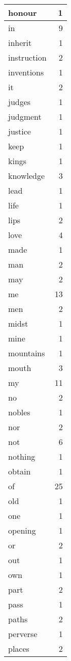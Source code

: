 \begin{center}
\begin{longtable}{l|r}
honour & 1\\ \hline 
in & 9\\ \hline 
inherit & 1\\ \hline 
instruction & 2\\ \hline 
inventions & 1\\ \hline 
it & 2\\ \hline 
judges & 1\\ \hline 
judgment & 1\\ \hline 
justice & 1\\ \hline 
keep & 1\\ \hline 
kings & 1\\ \hline 
knowledge & 3\\ \hline 
lead & 1\\ \hline 
life & 1\\ \hline 
lips & 2\\ \hline 
love & 4\\ \hline 
made & 1\\ \hline 
man & 2\\ \hline 
may & 2\\ \hline 
me & 13\\ \hline 
men & 2\\ \hline 
midst & 1\\ \hline 
mine & 1\\ \hline 
mountains & 1\\ \hline 
mouth & 3\\ \hline 
my & 11\\ \hline 
no & 2\\ \hline 
nobles & 1\\ \hline 
nor & 2\\ \hline 
not & 6\\ \hline 
nothing & 1\\ \hline 
obtain & 1\\ \hline 
of & 25\\ \hline 
old & 1\\ \hline 
one & 1\\ \hline 
opening & 1\\ \hline 
or & 2\\ \hline 
out & 1\\ \hline 
own & 1\\ \hline 
part & 2\\ \hline 
pass & 1\\ \hline 
paths & 2\\ \hline 
perverse & 1\\ \hline 
places & 2\\ \hline 

\end{longtable}
\end{center}
